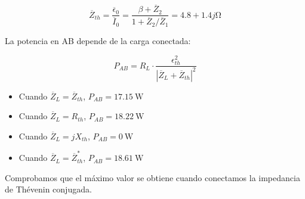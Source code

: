 \begin{equation*}
  \overline{Z}_{th} = \frac{\overline{\epsilon}_0}{\overline{I}_0} = \frac{\beta + \overline{Z}_2}{1 + \overline{Z}_2/\overline{Z}_1} = 4.8 + 1.4j\si{\ohm}
\end{equation*}

La potencia en AB depende de la carga conectada:

\begin{equation*}
  P_{AB} = R_L \cdot \frac{\epsilon_{th}^2}{|\overline{Z}_L + \overline{Z}_{th}|^2}
\end{equation*}

\begin{itemize}
\item Cuando $\overline{Z}_L = \overline{Z}_{th}$,
  $P_{AB} = \SI{17.15}{\watt}$
\item Cuando $\overline{Z}_L = R_{th}$, $P_{AB} = \SI{18.22}{\watt}$
\item Cuando $\overline{Z}_L = jX_{th}$, $P_{AB} = \SI{0}{\watt}$
\item Cuando $\overline{Z}_L = \overline{Z}^*_{th}$,
  $P_{AB} = \SI{18.61}{\watt}$
\end{itemize}

Comprobamos que el máximo valor se obtiene cuando conectamos la
impedancia de Thévenin conjugada.




